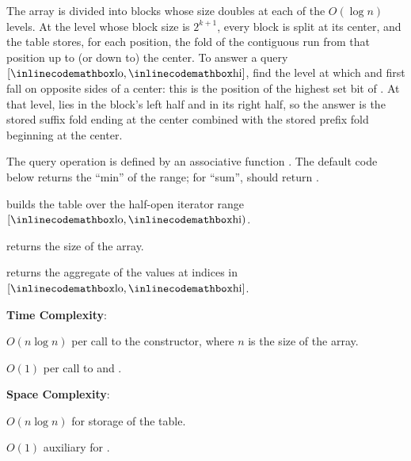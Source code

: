 The array is divided into blocks whose size doubles at each of the $O(\log n)$ levels. At the level whose block size is $2^{k+1}$, every block is split at its center, and the table stores, for each position, the fold of the contiguous run from that position up to (or down to) the center. To answer a query $[{\inlinecodemath{lo}}, {\inlinecodemath{hi}}]$, find the level at which  and  first fall on opposite sides of a center: this is the position of the highest set bit of . At that level,  lies in the block's left half and  in its right half, so the answer is the stored suffix fold ending at the center combined with the stored prefix fold beginning at the center.

The query operation is defined by an associative function . The default code below returns the ``min'' of the range; for ``sum'',  should return .

\begin{compactitem}
  \item {} builds the table over the half-open iterator range $[{\inlinecodemath{lo}}, {\inlinecodemath{hi}})$.
  \item {} returns the size of the array.
  \item {} returns the aggregate of the values at indices in $[{\inlinecodemath{lo}}, {\inlinecodemath{hi}}]$.
\end{compactitem}

\textbf{Time Complexity}:
\begin{compactitem}
  \item $O(n \log n)$ per call to the constructor, where $n$ is the size of the array.
  \item $O(1)$ per call to  and .
\end{compactitem}

\textbf{Space Complexity}:
\begin{compactitem}
  \item $O(n \log n)$ for storage of the table.
  \item $O(1)$ auxiliary for .
\end{compactitem}

